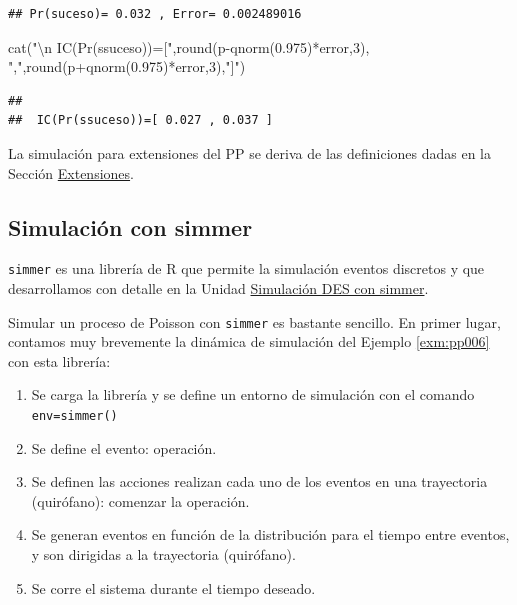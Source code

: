 \documentclass[
]{book}
\newenvironment{Shaded}{\begin{snugshade}}{\end{snugshade}}
\newcommand{\DecValTok}[1]{\textcolor[rgb]{0.00,0.00,0.81}{#1}}
\newcommand{\FloatTok}[1]{\textcolor[rgb]{0.00,0.00,0.81}{#1}}
\newcommand{\FunctionTok}[1]{\textcolor[rgb]{0.00,0.00,0.00}{#1}}
\newcommand{\NormalTok}[1]{#1}
\newcommand{\SpecialCharTok}[1]{\textcolor[rgb]{0.00,0.00,0.00}{#1}}
\newcommand{\StringTok}[1]{\textcolor[rgb]{0.31,0.60,0.02}{#1}}
\providecommand{\tightlist}{%
  \setlength{\itemsep}{0pt}\setlength{\parskip}{0pt}}
\theoremstyle{definition}
\theoremstyle{definition}
\theoremstyle{definition}
\theoremstyle{definition}
\theoremstyle{remark}
\begin{document}
\begin{verbatim}
## Pr(suceso)= 0.032 , Error= 0.002489016
\end{verbatim}

\begin{Shaded}
\begin{Highlighting}[]
\FunctionTok{cat}\NormalTok{(}\StringTok{"}\SpecialCharTok{\textbackslash{}n}\StringTok{ IC(Pr(ssuceso))=["}\NormalTok{,}\FunctionTok{round}\NormalTok{(p}\SpecialCharTok{{-}}\FunctionTok{qnorm}\NormalTok{(}\FloatTok{0.975}\NormalTok{)}\SpecialCharTok{*}\NormalTok{error,}\DecValTok{3}\NormalTok{), }\StringTok{","}\NormalTok{,}\FunctionTok{round}\NormalTok{(p}\SpecialCharTok{+}\FunctionTok{qnorm}\NormalTok{(}\FloatTok{0.975}\NormalTok{)}\SpecialCharTok{*}\NormalTok{error,}\DecValTok{3}\NormalTok{),}\StringTok{"]"}\NormalTok{)}
\end{Highlighting}
\end{Shaded}

\begin{verbatim}
## 
##  IC(Pr(ssuceso))=[ 0.027 , 0.037 ]
\end{verbatim}

La simulación para extensiones del PP se deriva de las definiciones dadas en la Sección \href{extensiones_pp}{Extensiones}.

\hypertarget{simulaciuxf3n-con-simmer}{%
\subsection{Simulación con simmer}\label{simulaciuxf3n-con-simmer}}

\texttt{simmer}\citep{R-simmer} es una librería de R que permite la simulación eventos discretos y que desarrollamos con detalle en la Unidad \protect\hyperlink{simmer-unidad}{Simulación DES con simmer}.

Simular un proceso de Poisson con \texttt{simmer} es bastante sencillo. En primer lugar, contamos muy brevemente la dinámica de simulación del Ejemplo \ref{exm:pp006} con esta librería:

\begin{enumerate}
\def\labelenumi{\arabic{enumi}.}
\tightlist
\item
  Se carga la librería y se define un entorno de simulación con el comando \texttt{env=simmer()}
\item
  Se define el evento: operación.
\item
  Se definen las acciones realizan cada uno de los eventos en una trayectoria (quirófano): comenzar la operación.
\item
  Se generan eventos en función de la distribución para el tiempo entre eventos, y son dirigidas a la trayectoria (quirófano).
\item
  Se corre el sistema durante el tiempo deseado.
\end{enumerate}
\end{document}
